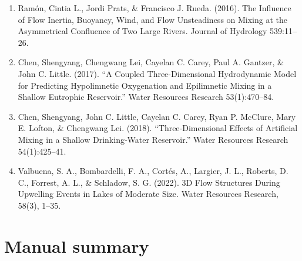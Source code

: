 \begin{enumerate}
    \item Ramón, Cintia L., Jordi Prats, \& Francisco J. Rueda. (2016). The Influence of Flow Inertia, Buoyancy, Wind, and Flow Unsteadiness on Mixing at the Asymmetrical Confluence of Two Large Rivers. Journal of Hydrology 539:11–26.
    \item Chen, Shengyang, Chengwang Lei, Cayelan C. Carey, Paul A. Gantzer, \& John C. Little. (2017). “A Coupled Three-Dimensional Hydrodynamic Model for Predicting Hypolimnetic Oxygenation and Epilimnetic Mixing in a Shallow Eutrophic Reservoir.” Water Resources Research 53(1):470–84.
    \item Chen, Shengyang, John C. Little, Cayelan C. Carey, Ryan P. McClure, Mary E. Lofton, \& Chengwang Lei. (2018). “Three‐Dimensional Effects of Artificial Mixing in a Shallow Drinking‐Water Reservoir.” Water Resources Research 54(1):425–41.
    \item Valbuena, S. A., Bombardelli, F. A., Cort\'{e}s, A., Largier, J. L., Roberts, D. C., Forrest, A. L., \& Schladow, S. G. (2022). 3D Flow Structures During Upwelling Events in Lakes of Moderate Size. Water Resources Research, 58(3), 1–35.
\end{enumerate}


\section{Manual summary} 
